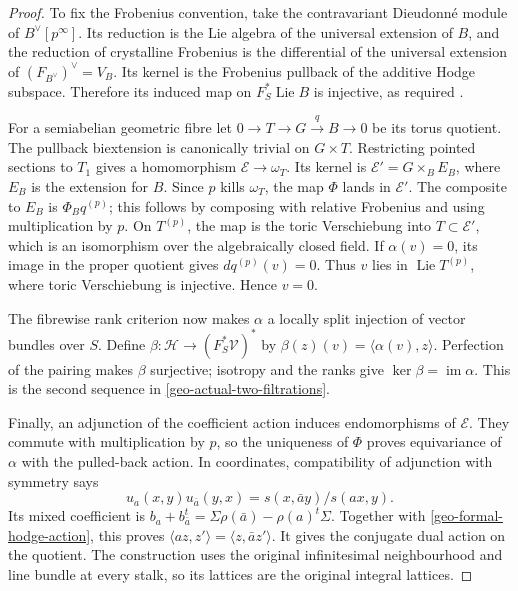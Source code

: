 \begin{proof}
To fix the Frobenius convention, take the contravariant
Dieudonn\'e module of $B^\vee[p^\infty]$.
Its reduction is the Lie algebra of the universal extension of
$B$, and the reduction of crystalline Frobenius is the differential
of the universal extension of
$(F_{B^\vee})^\vee=V_B$.
Its kernel is the Frobenius pullback of the additive Hodge
subspace. Therefore its induced map on $F_S^*\operatorname{Lie}B$
is injective, as required
\cite[II, \S\S9 and 13]{mazur-messing-universal}
\cite[\S1.1.4, equation (1.1.4.1)]{madapusi-pera-realizations}.

For a semiabelian geometric fibre let
$0\to T\to G\xrightarrow{q}B\to0$ be its torus quotient.
The pullback biextension is canonically trivial on $G\times T$.
Restricting pointed sections to $T_1$ gives a homomorphism
$\mathcal E\to\omega_T$. Its kernel is
$\mathcal E'=G\times_B E_B$, where $E_B$ is the extension for $B$.
Since $p$ kills $\omega_T$, the map $\Phi$ lands in $\mathcal E'$.
The composite to $E_B$ is $\Phi_Bq^{(p)}$; this follows by
composing with relative Frobenius and using multiplication by $p$.
On $T^{(p)}$, the map is the toric Verschiebung into
$T\subset\mathcal E'$, which is an isomorphism over the
algebraically closed field.
If $\alpha(v)=0$, its image in the proper quotient gives
$dq^{(p)}(v)=0$. Thus $v$ lies in $\operatorname{Lie}T^{(p)}$,
where toric Verschiebung is injective. Hence $v=0$.

The fibrewise rank criterion now makes $\alpha$ a locally split
injection of vector bundles over $S$.
Define $\beta:\mathcal H\to(F_S^*\mathcal V)^*$ by
$\beta(z)(v)=\langle\alpha(v),z\rangle$.
Perfection of the pairing makes $\beta$ surjective; isotropy and
the ranks give $\ker\beta=\operatorname{im}\alpha$.
This is the second sequence in
\eqref{geo-actual-two-filtrations}.

Finally, an adjunction of the coefficient action induces
endomorphisms of $\mathcal E$. They commute with multiplication
by $p$, so the uniqueness of $\Phi$ proves equivariance of
$\alpha$ with the pulled-back action. In coordinates, compatibility
of adjunction with symmetry says
\[
 u_a(x,y)u_{\bar a}(y,x)
                    =s(x,\bar a y)/s(ax,y).
\]
Its mixed coefficient is
$b_a+b_{\bar a}^t=\Sigma\rho(\bar a)-\rho(a)^t\Sigma$.
Together with \eqref{geo-formal-hodge-action}, this proves
$\langle az,z'\rangle=\langle z,\bar a z'\rangle$.
It gives the conjugate dual action on the quotient.
The construction uses the original infinitesimal
neighbourhood and line bundle at every stalk, so its lattices are
the original integral lattices.
\end{proof}

